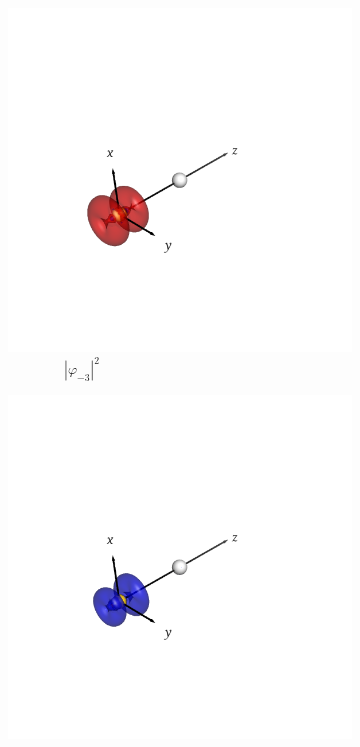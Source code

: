\documentclass[journal=inoraj,manuscript=article]{achemso}
\begin{document}
\begin{figure}[!h]
    \vspace{0.0cm}
    \begin{subfigure}[t]{0.32\textwidth}
        \centering
        \includegraphics[width=\linewidth]{./AuFl+/nocv-5.png} 
        \caption*{\ \ \ \ \ \ \ \ $|\varphi_{-3}|^2$} 
    \end{subfigure}
    \hfill
    \begin{subfigure}[t]{0.32\textwidth}
        \centering
        \includegraphics[width=\linewidth]{./AuFl+/nocv+5.png} 

\end{subfigure}
\end{figure}
\end{document}
